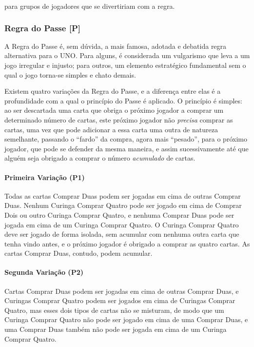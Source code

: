 para grupos de jogadores que se divertiriam com a regra.

\subsubsection{Regra do Passe [P]}

A Regra do Passe é, sem dúvida, a mais famosa, adotada e debatida regra alternativa para o UNO. Para alguns, é considerada um vulgarismo que leva a um jogo irregular e injusto; para outros, um elemento estratégico fundamental sem o qual o jogo torna-se simples e chato demais.

Existem quatro variações da Regra do Passe, e a diferença entre elas é a profundidade com a qual o princípio do Passe é aplicado. O princípio é simples: ao ser descartada uma carta que obriga o próximo jogador a comprar um determinado número de cartas, este próximo jogador não \emph{precisa} comprar as cartas, uma vez que pode adicionar a essa carta uma outra de natureza semelhante, passando o ``fardo'' da compra, agora mais ``pesado'', para o próximo jogador, que pode se defender da mesma maneira, e assim sucessivamente até que alguém seja obrigado a comprar o número \emph{acumulado} de cartas.

\paragraph{Primeira Variação (P1)} Todas as cartas Comprar Duas podem ser jogadas em cima de outras Comprar Duas. Nenhum Curinga Comprar Quatro pode ser jogado em cima de Comprar Dois ou outro Curinga Comprar Quatro, e nenhuma Comprar Duas pode ser jogada em cima de um Curinga Comprar Quatro. O Curinga Comprar Quatro deve ser jogado de forma isolada, sem acumular com nenhuma outra carta que tenha vindo antes, e o próximo jogador é obrigado a comprar as quatro cartas. As cartas Comprar Duas, contudo, podem acumular.

\paragraph{Segunda Variação (P2)} Cartas Comprar Duas podem ser jogadas em cima de outras Comprar Duas, e Curingas Comprar Quatro podem ser jogados em cima de Curingas Comprar Quatro, mas esses dois tipos de cartas não se misturam, de modo que um Curinga Comprar Quatro não pode ser jogado em cima de uma Comprar Duas, e uma Comprar Duas também não pode ser jogada em cima de um Curinga Comprar Quatro.

